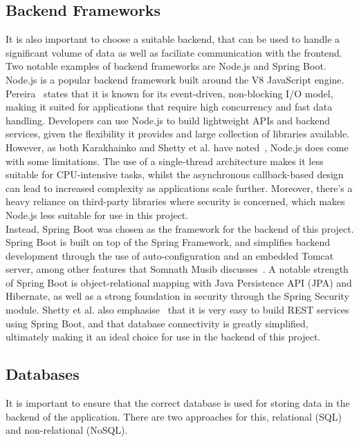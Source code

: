 \documentclass[]{final_report}
\begin{document}
\subsection{Backend Frameworks}

It is also important to choose a suitable backend, that can be used to handle a significant volume of data as well as faciliate communication with the frontend. Two notable examples of backend frameworks are Node.js and Spring Boot.\\

Node.js is a popular backend framework built around the V8 JavaScript engine. Pereira~\cite{NODE_API} states that it is known for its event-driven, non-blocking I/O model, making it suited for applications that require high concurrency and fast data handling. Developers can use Node.js to build lightweight APIs and backend services, given the flexibility it provides and large collection of libraries available. However, as both Karakhainko and Shetty et al. have noted~\cite{BACKEND_FRAMEWORKS_BLOG,BACKEND_FRAMEWORKS_REPORT}, Node.js does come with some limitations. The use of a single-thread architecture makes it less suitable for CPU-intensive tasks, whilst the asynchronous callback-based design can lead to increased complexity as applications scale further. Moreover, there's a heavy reliance on third-party libraries where security is concerned, which makes Node.js less suitable for use in this project.\\

Instead, Spring Boot was chosen as the framework for the backend of this project. Spring Boot is built on top of the Spring Framework, and simplifies backend development through the use of auto-configuration and an embedded Tomcat server, among other features that Somnath Musib discusses~\cite{MUSIB_SPRING}. A notable strength of Spring Boot is object-relational mapping with Java Persistence API (JPA) and Hibernate, as well as a strong foundation in security through the Spring Security module. Shetty et al. also emphasise~\cite{BACKEND_FRAMEWORKS_REPORT} that it is very easy to build REST services using Spring Boot, and that database connectivity is greatly simplified, ultimately making it an ideal choice for use in the backend of this project.

\subsection{Databases}

It is important to ensure that the correct database is used for storing data in the backend of the application. There are two approaches for this, relational (SQL) and non-relational (NoSQL).\\
\end{document}
